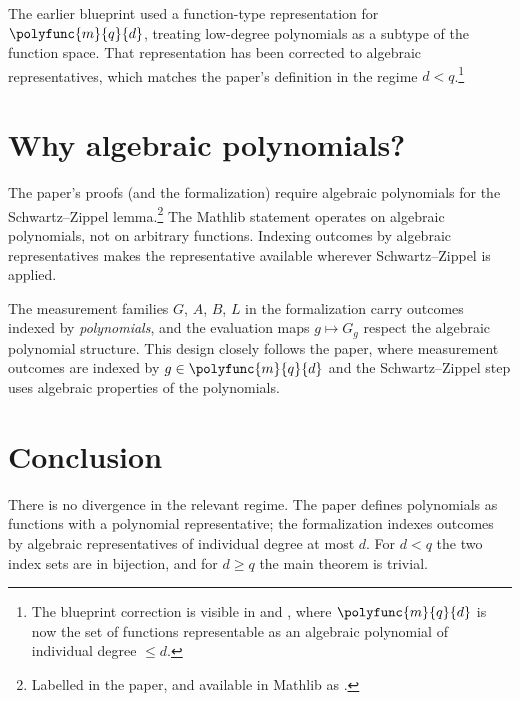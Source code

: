 \documentclass{article}
\begin{document}
The earlier blueprint used a function-type representation for
$\polyfunc{m}{q}{d}$, treating low-degree polynomials as a subtype
of the function space. That representation has been corrected to
algebraic representatives, which matches the paper's definition in the
regime $d<q$.\footnote{The blueprint correction is visible in
 and
, where
$\polyfunc{m}{q}{d}$ is now the set of functions representable as an
algebraic polynomial of individual degree $\le d$.}

\section{Why algebraic polynomials?}

The paper's proofs (and the formalization) require algebraic
polynomials for the Schwartz--Zippel lemma.\footnote{Labelled
 in the paper, and available
in Mathlib as .}
The Mathlib statement operates on algebraic polynomials, not on
arbitrary functions. Indexing outcomes by algebraic representatives makes the
representative available wherever Schwartz--Zippel is applied.

The measurement families $G$, $A$, $B$, $L$ in the formalization
carry outcomes indexed by \emph{polynomials}, and the evaluation
maps $g \mapsto G_{g}$ respect the algebraic polynomial structure.
This design closely follows the paper, where measurement outcomes
are indexed by $g \in \polyfunc{m}{q}{d}$ and the Schwartz--Zippel
step uses algebraic properties of the polynomials.

\section{Conclusion}

There is no divergence in the relevant regime. The paper defines
polynomials as functions with a polynomial representative; the
formalization indexes outcomes by algebraic representatives of individual
degree at most $d$. For $d<q$ the two index sets are in bijection, and for
$d\ge q$ the main theorem is trivial.



\end{document}
